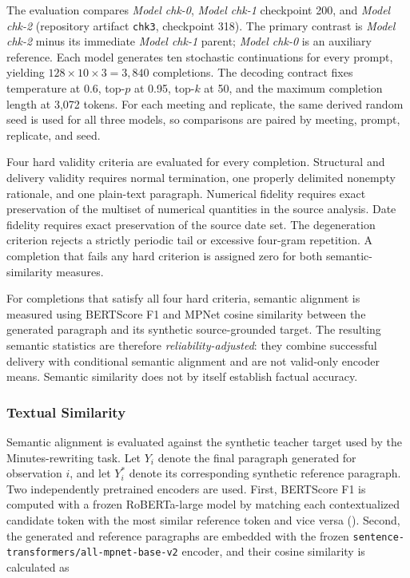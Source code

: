 The evaluation compares \textit{Model chk-0}, \textit{Model chk-1} checkpoint
200, and \textit{Model chk-2} (repository artifact \texttt{chk3}, checkpoint
318). The primary contrast is \textit{Model chk-2} minus its immediate
\textit{Model chk-1} parent; \textit{Model chk-0} is an auxiliary reference.
Each model generates ten stochastic continuations for every prompt, yielding
\(128\times10\times3=3{,}840\) completions. The decoding contract fixes
temperature at 0.6, top-$p$ at 0.95, top-$k$ at 50, and the maximum completion
length at 3,072 tokens. For each meeting and replicate, the same derived random
seed is used for all three models, so comparisons are paired by meeting,
prompt, replicate, and seed.

Four hard validity criteria are evaluated for every completion. Structural and
delivery validity requires normal termination, one properly delimited nonempty
rationale, and one plain-text paragraph. Numerical fidelity requires exact
preservation of the multiset of numerical quantities in the source analysis.
Date fidelity requires exact preservation of the source date set. The
degeneration criterion rejects a strictly periodic tail or excessive four-gram
repetition. A completion that fails any hard criterion is assigned zero for
both semantic-similarity measures.

For completions that satisfy all four hard criteria, semantic alignment is
measured using BERTScore F1 and MPNet cosine similarity between the generated
paragraph and its synthetic source-grounded target. The resulting semantic
statistics are therefore \emph{reliability-adjusted}: they combine successful
delivery with conditional semantic alignment and are not valid-only encoder
means. Semantic similarity does not by itself establish factual accuracy.

\subsubsection*{Textual Similarity}

Semantic alignment is evaluated against the synthetic teacher target used by
the Minutes-rewriting task.  Let \(Y_i\) denote the final paragraph generated
for observation \(i\), and let \(Y_i^{*}\) denote its corresponding synthetic
reference paragraph.  Two independently pretrained encoders are used.  First,
BERTScore F1 is computed with a frozen RoBERTa-large model by matching each
contextualized candidate token with the most similar reference token and vice
versa (\cite{zhang2019bertscore}).  Second, the generated and reference
paragraphs are embedded with the frozen
\texttt{sentence-transformers/all-mpnet-base-v2} encoder, and their cosine
similarity is calculated as

